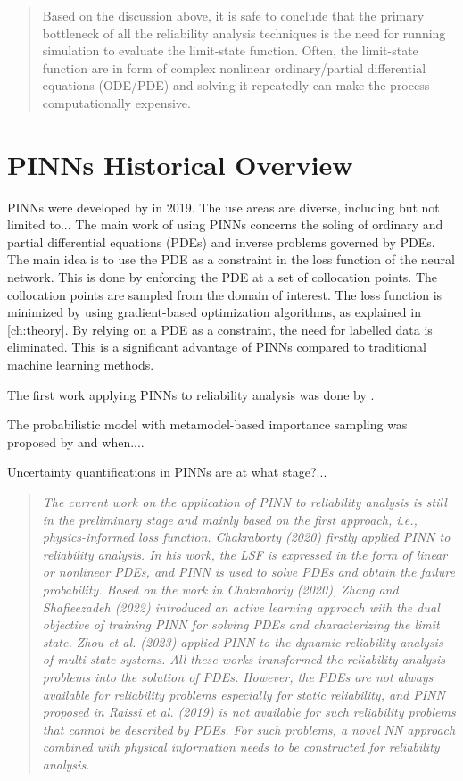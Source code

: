 \begin{quotation}
    Based on the discussion above, it is safe to conclude that the primary bottleneck of all the reliability analysis techniques is the need for running simulation to evaluate the limit-state function. Often, the limit-state function are in form of complex nonlinear ordinary/partial differential equations (ODE/PDE) and solving it repeatedly can make the process computationally expensive. \citep{chakraborty2020simulationfreereliabilityanalysis}
\end{quotation}


\section{PINNs Historical Overview}
\label{sec:historical-overview}

PINNs were developed by \cite{raissi2019pinns} in 2019. The use areas are diverse, including but not limited to...
The main work of using PINNs concerns the soling of ordinary and partial differential equations (PDEs) and inverse problems governed by PDEs. The main idea is to use the PDE as a constraint in the loss function of the neural network. This is done by enforcing the PDE at a set of collocation points. The collocation points are sampled from the domain of interest. The loss function is minimized by using gradient-based optimization algorithms, as explained in \ref{ch:theory}. By relying on a PDE as a constraint, the need for labelled data is eliminated. This is a significant advantage of PINNs compared to traditional machine learning methods. 

The first work applying PINNs to reliability analysis was done by \citet{chakraborty2020simulationfreereliabilityanalysis}. 

The probabilistic model with metamodel-based importance sampling was proposed by and when....

Uncertainty quantifications in PINNs are at what stage?...
\begin{quotation}
    \textit{The current work on the application of PINN to reliability analysis is still in the preliminary stage and mainly based on the first approach, i.e., physics-informed loss function. Chakraborty (2020) firstly applied PINN to reliability analysis. In his work, the LSF is expressed in the form of linear or nonlinear PDEs, and PINN is used to solve PDEs and obtain the failure probability. Based on the work in Chakraborty (2020), Zhang and Shafieezadeh (2022) introduced an active learning approach with the dual objective of training PINN for solving PDEs and characterizing the limit state. Zhou et al. (2023) applied PINN to the dynamic reliability analysis of multi-state systems. All these works transformed the reliability analysis problems into the solution of PDEs. However, the PDEs are not always available for reliability problems especially for static reliability, and PINN proposed in Raissi et al. (2019) is not available for such reliability problems that cannot be described by PDEs. For such problems, a novel NN approach combined with physical information needs to be constructed for reliability analysis.} 
    \cite{bai2023reliability}
\end{quotation}

